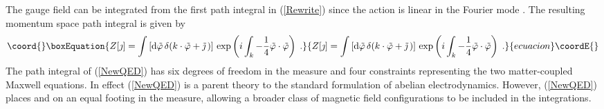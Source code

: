 \documentclass[a4paper,a4paper]{article}
\begin{document}
The gauge field \coordHE{} can be integrated from the first path integral in (\ref{Rewrite}) since the action is linear in the Fourier mode \coordHE{}.  The resulting momentum space path integral is given by
\begin{equation}\coord{}\boxEquation{
\label{NewQED}
Z[\jmath] = \int \left[ {\rm d} \tilde{\varphi} \,  \delta( k \cdot \tilde{\varphi} + \tilde{\jmath} \,) \right]  \, \exp \left( i \int_k - {\small \frac{1}{4}} \tilde{\varphi} \cdot \tilde{\varphi} \right) \; .
}{
Z[\jmath] = \int \left[ {\rm d} \tilde{\varphi} \,  \delta( k \cdot \tilde{\varphi} + \tilde{\jmath} \,) \right]  \, \exp \left( i \int_k - {\small \frac{1}{4}} \tilde{\varphi} \cdot \tilde{\varphi} \right) \; .
}{ecuacion}\coordE{}\end{equation}
The path integral of (\ref{NewQED}) has six degrees of freedom in the measure and four constraints representing the two matter-coupled Maxwell equations.  In effect (\ref{NewQED}) is a parent theory to the standard formulation of abelian electrodynamics. However, (\ref{NewQED}) places \coordHE{} and \coordHE{} on an equal footing in the measure, allowing a broader class of magnetic field configurations to be included in the integrations. 
\end{document}

